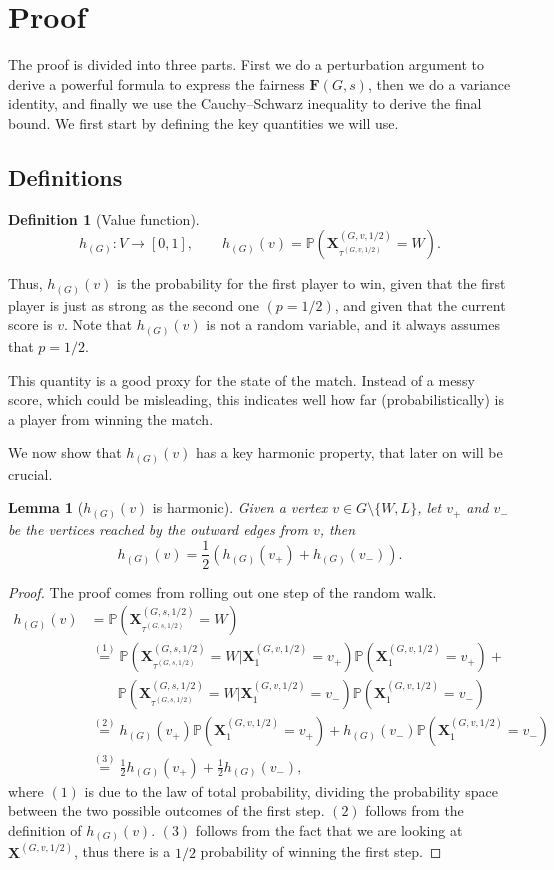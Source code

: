 \documentclass{article}
\newtheorem{definition}{Definition}
\newtheorem{lemma}{Lemma}
\newcommand{\win}{W}
\newcommand{\lose}{L}
\newcommand{\x}{\mathbf{X}}
\newcommand{\xghalf}{\x^{\left(G, s, 1/2\right)}}
\newcommand{\taughalf}{{\tau^{\left(G, s, 1/2\right)}}}
\newcommand{\pr}{\mathbb{P}}
\newcommand{\fair}{\mathbf{F}}
\newcommand{\h}{h}
\begin{document}
\section*{Proof}
The proof is divided into three parts. First we do a perturbation argument to derive a powerful formula to express the fairness $\fair(G, s)$, then we do a variance identity, and finally we use the Cauchy--Schwarz inequality to derive the final bound. We first start by defining the key quantities we will use.
\subsection*{Definitions}
\begin{definition}[Value function]
    $$
    \h_{(G)}: V \to [0,1], \quad\quad \h_{(G)}(v) = \pr\left( \x^{\left(G, v, 1/2\right)}_{\tau^{\left(G, v, 1/2\right)}} = \win\right).
    $$
\end{definition}
Thus, $\h_{(G)}(v)$ is the probability for the first player to win, given that the first player is just as strong as the second one $(p= 1/2)$, and given that the current score is $v$.
Note that $\h_{(G)}(v)$ is not a random variable, and it always assumes that $p = 1/2$.

This quantity is a good proxy for the state of the match. Instead of a messy score, which could be misleading, this indicates well how far (probabilistically) is a player from winning the match.

We now show that $\h_{(G)}(v)$ has a key harmonic property, that later on will be crucial.
\begin{lemma}[$\h_{(G)}(v)$ is harmonic] Given a vertex $v\in G\setminus\{\win, \lose\}$, let $v_+$ and $v_-$ be the vertices reached by the outward edges from $v$, then  
$$
\h_{(G)}(v) = \frac12\left(\h_{(G)}(v_+) + \h_{(G)}(v_-) \right).
$$

\end{lemma}
\begin{proof}
The proof comes from rolling out one step of the random walk.
\begin{align*}
    \h_{(G)}(v) &= \pr\left( \xghalf_\taughalf = \win\right) \\
    &\overset{(1)}{=} \pr\left( \xghalf_\taughalf = \win\vert \x^{(G, v, 1/2)}_1 = v_+\right)\pr\left(  \x^{(G, v, 1/2)}_1 = v_+\right) + \\ &\quad\quad\pr\left( \xghalf_\taughalf = \win\vert \x^{(G, v, 1/2)}_1 = v_-\right)\pr\left(  \x^{(G, v, 1/2)}_1 = v_-\right) \\
    &\overset{(2)}{=}\h_{(G)}(v_+)\pr\left(  \x^{(G, v, 1/2)}_1 = v_+\right) +  \h_{(G)}(v_-)\pr\left(\x^{(G, v, 1/2)}_1 = v_-\right) \\
    & \overset{(3)}{=} \frac12 \h_{(G)}(v_+) + \frac12\h_{(G)}(v_-),
\end{align*}
where $(1)$ is due to the law of total probability, dividing the probability space between the two possible outcomes of the first step. $(2)$ follows from the definition of $\h_{(G)}(v)$. $(3)$ follows from the fact that we are looking at $\x^{(G, v, 1/2)}$, thus there is a $1/2$ probability of winning the first step.
\end{proof}
\end{document}
